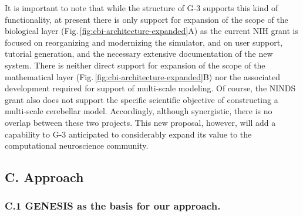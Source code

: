 \documentclass[12pt]{article}
\begin{document}


It is important to note that while the structure of G-3 supports this
kind of functionality, at present there is only support for expansion
of the scope of the biological layer
(Fig.\,\ref{fig:cbi-architecture-expanded}A) as the current NIH grant
is focused on reorganizing and modernizing the simulator, and on user
support, tutorial generation, and the necessary extensive
documentation of the new system. There is neither direct support for
expansion of the scope of the mathematical layer
(Fig.\,\ref{fig:cbi-architecture-expanded}B) nor the associated
development required for support of multi-scale modeling.  Of course,
the NINDS grant also does not support the specific scientific
objective of constructing a multi-scale cerebellar model.
Accordingly, although synergistic, there is no overlap between these
two projects. This new proposal, however, will add a capability to G-3
anticipated to considerably expand
its value to the computational neuroscience community.\\

\subsection*{C. Approach}

\subsubsection*{C.1 GENESIS as the basis for our approach.}
\end{document}
